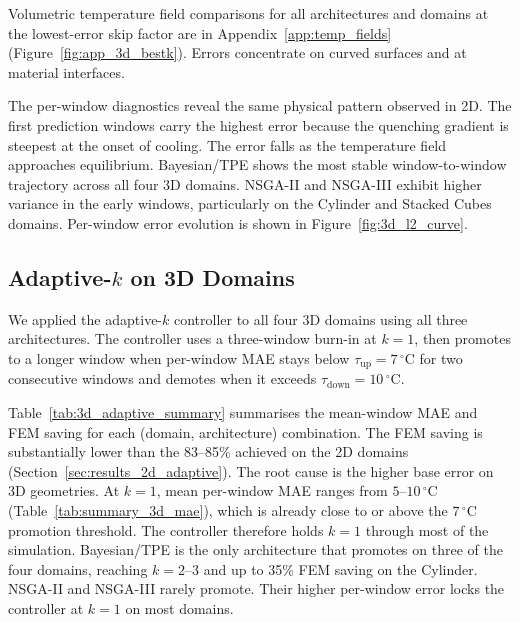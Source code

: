 Volumetric temperature field comparisons for all architectures and domains at
the lowest-error skip factor are in Appendix~\ref{app:temp_fields}
(Figure~\ref{fig:app_3d_bestk}).
Errors concentrate on curved surfaces and at material interfaces.

The per-window diagnostics reveal the same physical pattern observed in 2D.
The first prediction windows carry the highest error because the quenching
gradient is steepest at the onset of cooling. The error falls as the
temperature field approaches equilibrium. Bayesian/TPE shows the most stable
window-to-window trajectory across all four 3D domains. NSGA-II and NSGA-III
exhibit higher variance in the early windows, particularly on the Cylinder and
Stacked Cubes domains. Per-window error evolution is shown in Figure~\ref{fig:3d_l2_curve}.

\subsection{Adaptive-\texorpdfstring{$k$}{k} on 3D Domains}
\label{subsec:3d_adaptive}

We applied the adaptive-$k$ controller to all four 3D domains using all three
architectures.
The controller uses a three-window burn-in at $k=1$, then promotes to a longer
window when per-window MAE stays below $\tau_\mathrm{up}=7\,^\circ\mathrm{C}$
for two consecutive windows and demotes when it exceeds
$\tau_\mathrm{down}=10\,^\circ\mathrm{C}$.

Table~\ref{tab:3d_adaptive_summary} summarises the mean-window MAE and FEM saving
for each (domain, architecture) combination.
The FEM saving is substantially lower than the 83--85\% achieved on the 2D domains
(Section~\ref{sec:results_2d_adaptive}).
The root cause is the higher base error on 3D geometries.
At $k=1$, mean per-window MAE ranges from $5$--$10\,^\circ\mathrm{C}$
(Table~\ref{tab:summary_3d_mae}), which is already close to or above the
$7\,^\circ\mathrm{C}$ promotion threshold.
The controller therefore holds $k=1$ through most of the simulation.
Bayesian/TPE is the only architecture that promotes on three of the four domains,
reaching $k=2$--$3$ and up to 35\% FEM saving on the Cylinder.
NSGA-II and NSGA-III rarely promote.
Their higher per-window error locks the controller at $k=1$ on most domains.

